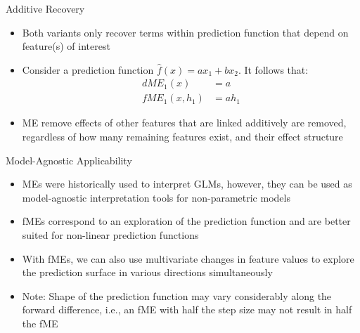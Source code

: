\documentclass[11pt,compress,t,notes=noshow, aspectratio=169, xcolor=table]{beamer}
\begin{document}

\begin{frame}{Additive Recovery}

\begin{itemize}
\itemsep1em
\item Both variants only recover terms within prediction function that depend on feature(s) of interest
\item Consider a prediction function $\widehat{f}(x) = ax_1 + bx_2$. It follows that:
\begin{align*}
dME_1(x) &= a \\
fME_1(x, h_1) &= ah_1
\end{align*}
\item ME remove effects of other features that are linked additively are removed, regardless of how many remaining features exist, and their effect structure
\end{itemize}

\end{frame}


\begin{frame}{Model-Agnostic Applicability}

\begin{itemize}
\itemsep1em
\item MEs were historically used to interpret GLMs, however, they can be used as model-agnostic interpretation tools for non-parametric models 
\item fMEs correspond to an exploration of the prediction function and are better suited for non-linear prediction functions
\item With fMEs, we can also use multivariate changes in feature values to explore the prediction surface in various directions simultaneously
\item Note: Shape of the prediction function may vary considerably along the forward difference, i.e., an fME with half the step size may not result in half the fME
\end{itemize}

\end{frame}
\end{document}
